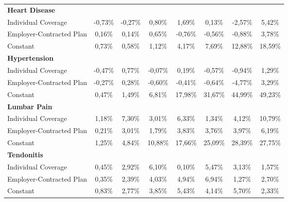 \documentclass{article}
\begin{document}
\begin{table*}
{\begin{tabular}{l*{7}{c}}
\midrule
\textbf{Heart Disease}  & & & & & & & \\

Individual Coverage      & -0,73\%\sym{*}  & -0,27\%         &  0,80\%         &  1,69\%         &  0,13\%         & -2,57\%         &  5,42\%         \\
Employer-Contracted Plan &  0,16\%         &  0,14\%         &  0,65\%         & -0,76\%         & -0,56\%         & -0,88\%         &  3,78\%         \\
Constant                 &  0,73\%\sym{*}  &  0,58\%\sym{**} &  1,12\%\sym{**} &  4,17\%\sym{***}&  7,69\%\sym{***}& 12,88\%\sym{***}& 18,59\%\sym{***}\\

\midrule
\textbf{Hypertension}  & & & & & & & \\

Individual Coverage      & -0,47\%\sym{*}  &  0,77\%         & -0,07\%         &  0,19\%         & -0,57\%         & -0,94\%         &  1,29\%         \\
Employer-Contracted Plan & -0,27\%         &  0,28\%         & -0,60\%         & -0,41\%         & -0,64\%         & -4,77\%         &  3,29\%         \\
Constant                 &  0,47\%\sym{*}  &  1,49\%\sym{***}&  6,81\%\sym{***}& 17,98\%\sym{***}& 31,67\%\sym{***}& 44,99\%\sym{***}& 49,23\%\sym{***}\\

\midrule
\textbf{Lumbar Pain}  & & & & & & & \\

Individual Coverage      &  1,18\%         & \cellcolor[gray]{0.9} 7,30\%\sym{***}&  3,01\%         & \cellcolor[gray]{0.9} 6,33\%\sym{*}  &  1,34\%         &  4,12\%         & \cellcolor[gray]{0.9} 10,79\%\sym{*}  \\
Employer-Contracted Plan &  0,21\%         & \cellcolor[gray]{0.9} 3,01\%\sym{***}& \cellcolor[gray]{0.9} 1,79\%         & \cellcolor[gray]{0.9} 3,83\%\sym{*}  &  3,76\%         &  3,97\%         &  6,19\%         \\
Constant                 &  1,25\%\sym{***}&  4,84\%\sym{***}& 10,88\%\sym{***}& 17,66\%\sym{***}& 25,09\%\sym{***}& 28,39\%\sym{***}& 27,75\%\sym{***}\\

\midrule
\textbf{Tendonitis}  & & & & & & & \\

Individual Coverage      &  0,45\%         &  2,92\%         & \cellcolor[gray]{0.9} 6,10\%\sym{***}&  0,10\%         &\cellcolor[gray]{0.9}  5,47\%\sym{**} &  3,13\%         &  1,57\%         \\
Employer-Contracted Plan &  0,35\%         & \cellcolor[gray]{0.9} 2,39\%\sym{***}& \cellcolor[gray]{0.9} 4,03\%\sym{***}& \cellcolor[gray]{0.9} 4,94\%\sym{***}& \cellcolor[gray]{0.9} 6,94\%\sym{***}&  1,27\%         &  2,70\%         \\
Constant                 &  0,83\%\sym{**} &  2,77\%\sym{***}&  3,85\%\sym{***}&  5,43\%\sym{***}&  4,14\%\sym{***}&  5,70\%\sym{***}&  2,33\%\sym{**} \\


\end{tabular}}
\end{table*}
\end{document}
